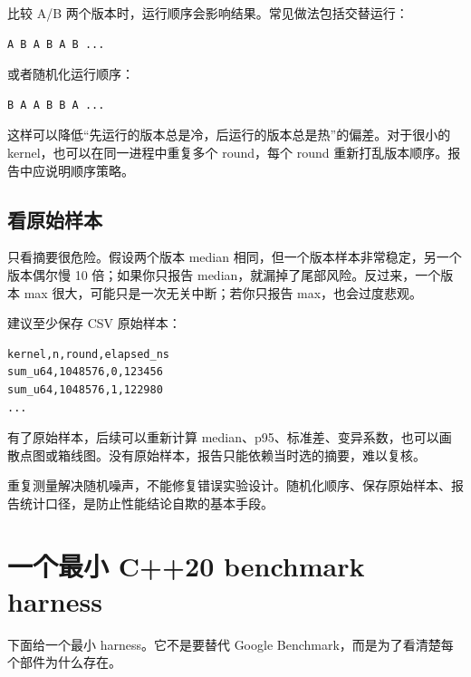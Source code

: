 比较 A/B 两个版本时，运行顺序会影响结果。常见做法包括交替运行：

\begin{lstlisting}
A B A B A B ...
\end{lstlisting}

或者随机化运行顺序：

\begin{lstlisting}
B A A B B A ...
\end{lstlisting}

这样可以降低“先运行的版本总是冷，后运行的版本总是热”的偏差。对于很小的 kernel，也可以在同一进程中重复多个 round，每个 round 重新打乱版本顺序。报告中应说明顺序策略。

\subsection{看原始样本}

只看摘要很危险。假设两个版本 median 相同，但一个版本样本非常稳定，另一个版本偶尔慢 10 倍；如果你只报告 median，就漏掉了尾部风险。反过来，一个版本 max 很大，可能只是一次无关中断；若你只报告 max，也会过度悲观。

建议至少保存 CSV 原始样本：

\begin{lstlisting}
kernel,n,round,elapsed_ns
sum_u64,1048576,0,123456
sum_u64,1048576,1,122980
...
\end{lstlisting}

有了原始样本，后续可以重新计算 median、p95、标准差、变异系数，也可以画散点图或箱线图。没有原始样本，报告只能依赖当时选的摘要，难以复核。

\begin{keyidea}
重复测量解决随机噪声，不能修复错误实验设计。随机化顺序、保存原始样本、报告统计口径，是防止性能结论自欺的基本手段。
\end{keyidea}

\section{一个最小 C++20 benchmark harness}

下面给一个最小 harness。它不是要替代 Google Benchmark，而是为了看清楚每个部件为什么存在。


